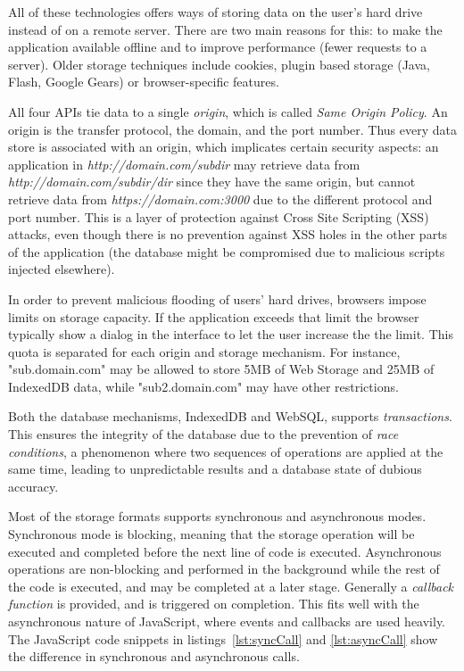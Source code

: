 All of these technologies offers ways of storing data on the user's hard drive instead of on a remote server. There are two main reasons for this: to make the application available offline and to improve performance (fewer requests to a server). Older storage techniques include cookies, plugin based storage (Java, Flash, Google Gears) or browser-specific features.

All four APIs tie data to a single \emph{origin}, which is called \emph{Same Origin Policy}. An origin is the transfer protocol, the domain, and the port number. Thus every data store is associated with an origin, which implicates certain security aspects: an application in \emph{http://domain.com/subdir} may retrieve data from \emph{http://domain.com/subdir/dir} since they have the same origin, but cannot retrieve data from \emph{https://domain.com:3000} due to the different protocol and port number. This is a layer of protection against Cross Site Scripting (XSS) attacks, even though there is no prevention against XSS holes in the other parts of the application (the database might be compromised due to malicious scripts injected elsewhere).

In order to prevent malicious flooding of users' hard drives, browsers impose limits on storage capacity. If the application exceeds that limit the browser typically show a dialog in the interface to let the user increase the the limit. This quota is separated for each origin and storage mechanism. For instance, "sub.domain.com" may be allowed to store 5MB of Web Storage and 25MB of IndexedDB data, while "sub2.domain.com" may have other restrictions.

Both the database mechanisms, IndexedDB and WebSQL, supports \emph{transactions}. This ensures the integrity of the database due to the prevention of \emph{race conditions}, a phenomenon where two sequences of operations are applied at the same time, leading to unpredictable results and a database state of dubious accuracy.

Most of the storage formats supports synchronous and asynchronous modes. Synchronous mode is blocking, meaning that the storage operation will be executed and completed before the next line of code is executed. Asynchronous operations are non-blocking and performed in the background while the rest of the code is executed, and may be completed at a later stage. Generally a \emph{callback function} is provided, and is triggered on completion. This fits well with the asynchronous nature of JavaScript, where events and callbacks are used heavily. The JavaScript code snippets in listings~\ref{lst:syncCall} and \ref{lst:asyncCall} show the difference in synchronous and asynchronous calls.

